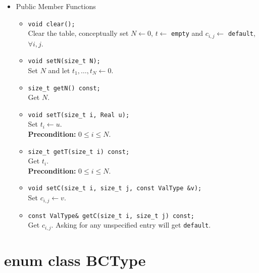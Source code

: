 \documentclass[12pt]{article}
\begin{document}
\begin{itemize}
        \item Public Member Functions 
              \begin{itemize}
                  \item \texttt{void clear();} \\
                        Clear the table, conceptually set \(N\leftarrow 0\), \(t\leftarrow \) \texttt{empty} and \(c_{i,j}\leftarrow\) \texttt{default}, \(\forall i,j\).
                  \item \texttt{void setN(size\_t N);} \\
                        Set \(N\) and let \(t_1,\dots, t_N\leftarrow 0\).
                  \item \texttt{size\_t getN() const;} \\
                        Get \(N\).
                  \item \texttt{void setT(size\_t i, Real u);} \\
                        Set \(t_i\leftarrow u\). \\
                        \textbf{Precondition:} \(0\le i\le N\).
                  \item \texttt{size\_t getT(size\_t i) const;} \\
                        Get \(t_i\). \\
                        \textbf{Precondition:} \(0\le i\le N\).
                  \item \texttt{void setC(size\_t i, size\_t j, const ValType \&v);} \\
                        Set \(c_{i,j}\leftarrow v\).
                  \item \texttt{const ValType\& getC(size\_t i, size\_t j) const;} \\
                        Get \(c_{i,j}\). Asking for any unspecified entry will get \texttt{default}.
              \end{itemize}
            
    \end{itemize}

\section{enum class BCType}
\end{document}
